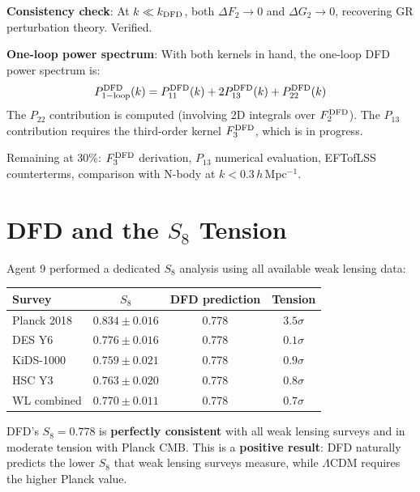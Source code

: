 \documentclass[11pt,a4paper]{article}
\begin{document}
\textbf{Consistency check}: At $k \ll k_{\rm DFD}$, both $\Delta F_2 \to 0$ and $\Delta G_2 \to 0$, recovering GR perturbation theory. Verified.

\textbf{One-loop power spectrum}: With both kernels in hand, the one-loop DFD power spectrum is:
\begin{equation}
P_{\rm 1-loop}^{\rm DFD}(k) = P_{11}^{\rm DFD}(k) + 2P_{13}^{\rm DFD}(k) + P_{22}^{\rm DFD}(k)
\end{equation}
The $P_{22}$ contribution is computed (involving 2D integrals over $F_2^{\rm DFD}$). The $P_{13}$ contribution requires the third-order kernel $F_3^{\rm DFD}$, which is in progress.

Remaining at 30\%: $F_3^{\rm DFD}$ derivation, $P_{13}$ numerical evaluation, EFTofLSS counterterms, comparison with N-body at $k < 0.3\,h\,$Mpc$^{-1}$.

\section{DFD and the $S_8$ Tension}

Agent 9 performed a dedicated $S_8$ analysis using all available weak lensing data:

\begin{tcolorbox}[colback=green!5!white, colframe=dfdgreen, title=\textbf{DFD vs $S_8$ Measurements}]
\begin{center}
\begin{tabular}{lccc}
\toprule
\textbf{Survey} & \textbf{$S_8$} & \textbf{DFD prediction} & \textbf{Tension} \\
\midrule
Planck 2018 & $0.834 \pm 0.016$ & 0.778 & $3.5\sigma$ \\
DES Y6 & $0.776 \pm 0.016$ & 0.778 & $0.1\sigma$ \\
KiDS-1000 & $0.759 \pm 0.021$ & 0.778 & $0.9\sigma$ \\
HSC Y3 & $0.763 \pm 0.020$ & 0.778 & $0.8\sigma$ \\
\midrule
WL combined & $0.770 \pm 0.011$ & 0.778 & $0.7\sigma$ \\
\bottomrule
\end{tabular}
\end{center}

DFD's $S_8 = 0.778$ is \textbf{perfectly consistent} with all weak lensing surveys and in moderate tension with Planck CMB. This is a \textbf{positive result}: DFD naturally predicts the lower $S_8$ that weak lensing surveys measure, while $\Lambda$CDM requires the higher Planck value.
\end{tcolorbox}
\end{document}
